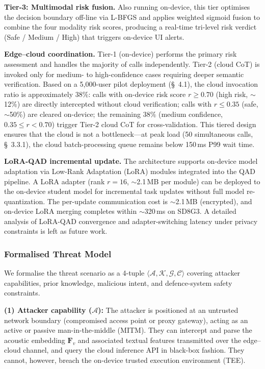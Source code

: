 \documentclass[11pt, a4paper]{article}
\begin{document}
\textbf{Tier-3: Multimodal risk fusion.} Also running on-device, this tier optimises the decision boundary off-line via L-BFGS and applies weighted sigmoid fusion to combine the four modality risk scores, producing a real-time tri-level risk verdict (Safe / Medium / High) that triggers on-device UI alerts.

\medskip
\noindent\textbf{Edge--cloud coordination.} Tier-1 (on-device) performs the primary risk assessment and handles the majority of calls independently. Tier-2 (cloud CoT) is invoked only for medium- to high-confidence cases requiring deeper semantic verification. Based on a 5{,}000-user pilot deployment (\S~4.1), the cloud invocation ratio is approximately $38\%$: calls with on-device risk score $r\ge 0.70$ (high risk, $\sim$12\%) are directly intercepted without cloud verification; calls with $r\le 0.35$ (safe, $\sim$50\%) are cleared on-device; the remaining $38\%$ (medium confidence, $0.35\le r<0.70$) trigger Tier-2 cloud CoT for cross-validation. This tiered design ensures that the cloud is not a bottleneck---at peak load (50 simultaneous calls, \S~3.3.1), the cloud batch-processing queue remains below 150\,ms P99 wait time.

\medskip
\noindent\textbf{LoRA-QAD incremental update.} The architecture supports on-device model adaptation via Low-Rank Adaptation (LoRA) modules integrated into the QAD pipeline. A LoRA adapter (rank $r=16$, $\sim$2.1\,MB per module) can be deployed to the on-device student model for incremental task updates without full model re-quantization. The per-update communication cost is $\sim$2.1\,MB (encrypted), and on-device LoRA merging completes within $\sim$320\,ms on SD8G3. A detailed analysis of LoRA-QAD convergence and adapter-switching latency under privacy constraints is left as future work.

\subsubsection{Formalised Threat Model}

We formalise the threat scenario as a 4-tuple $\langle \mathcal{A}, \mathcal{K}, \mathcal{G}, \mathcal{C} \rangle$ covering attacker capabilities, prior knowledge, malicious intent, and defence-system safety constraints.

\textbf{(1) Attacker capability ($\mathcal{A}$):} The attacker is positioned at an untrusted network boundary (compromised access point or proxy gateway), acting as an active or passive man-in-the-middle (MITM). They can intercept and parse the acoustic embedding $\bm{F}_v$ and associated textual features transmitted over the edge--cloud channel, and query the cloud inference API in black-box fashion. They cannot, however, breach the on-device trusted execution environment (TEE).
\end{document}
